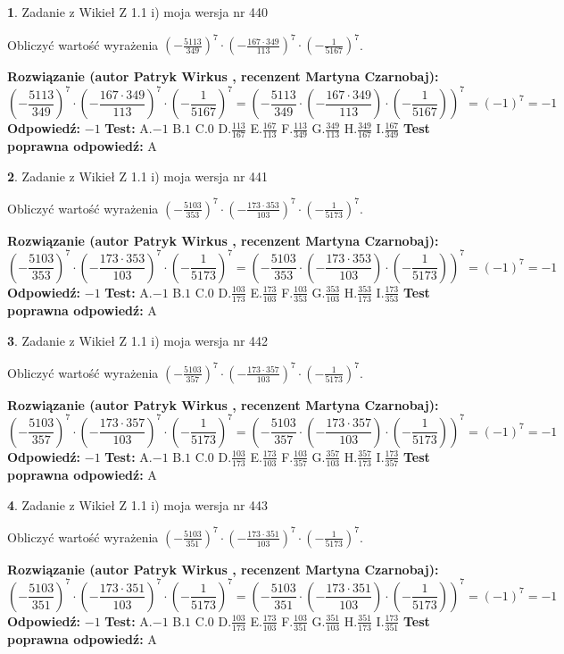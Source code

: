 \documentclass[12pt, a4paper]{article}
\theoremstyle{definition} %
\newtheorem{zad}{}
\newcommand{\zadStart}[1]{\begin{zad}#1\newline}
\newcommand{\zadStop}{\end{zad}}
\newcommand{\rozwStart}[2]{\noindent \textbf{Rozwiązanie (autor #1 , recenzent #2): }\newline}
\newcommand{\rozwStop}{\newline}
\newcommand{\odpStart}{\noindent \textbf{Odpowiedź:}\newline}
\newcommand{\odpStop}{\newline}
\newcommand{\testStart}{\noindent \textbf{Test:}\newline}
\newcommand{\testStop}{\newline}
\newcommand{\kluczStart}{\noindent \textbf{Test poprawna odpowiedź:}\newline}
\newcommand{\kluczStop}{\newline}
\begin{document}
\zadStart{Zadanie z Wikieł Z 1.1 i) moja wersja nr 440}

Obliczyć wartość wyrażenia $(-\frac{5113}{349})^{7} \cdot (-\frac{167 \cdot 349}{113})^{7} \cdot (-\frac{1}{5167})^{7}$.
\zadStop
\rozwStart{Patryk Wirkus}{Martyna Czarnobaj}
$$(-\frac{5113}{349})^{7} \cdot (-\frac{167 \cdot 349}{113})^{7} \cdot (-\frac{1}{5167})^{7} = (-\frac{5113}{349} \cdot (-\frac{167 \cdot 349}{113}) \cdot (-\frac{1}{5167}))^{7} = (-1)^{7} = -1$$
\rozwStop
\odpStart
$-1$
\odpStop
\testStart
A.$-1$ B.$1$ C.$0$ D.$\frac{113}{167}$ E.$\frac{167}{113}$
F.$\frac{113}{349}$ G.$\frac{349}{113}$
H.$\frac{349}{167}$
I.$\frac{167}{349}$
\testStop
\kluczStart
A
\kluczStop



\zadStart{Zadanie z Wikieł Z 1.1 i) moja wersja nr 441}

Obliczyć wartość wyrażenia $(-\frac{5103}{353})^{7} \cdot (-\frac{173 \cdot 353}{103})^{7} \cdot (-\frac{1}{5173})^{7}$.
\zadStop
\rozwStart{Patryk Wirkus}{Martyna Czarnobaj}
$$(-\frac{5103}{353})^{7} \cdot (-\frac{173 \cdot 353}{103})^{7} \cdot (-\frac{1}{5173})^{7} = (-\frac{5103}{353} \cdot (-\frac{173 \cdot 353}{103}) \cdot (-\frac{1}{5173}))^{7} = (-1)^{7} = -1$$
\rozwStop
\odpStart
$-1$
\odpStop
\testStart
A.$-1$ B.$1$ C.$0$ D.$\frac{103}{173}$ E.$\frac{173}{103}$
F.$\frac{103}{353}$ G.$\frac{353}{103}$
H.$\frac{353}{173}$
I.$\frac{173}{353}$
\testStop
\kluczStart
A
\kluczStop



\zadStart{Zadanie z Wikieł Z 1.1 i) moja wersja nr 442}

Obliczyć wartość wyrażenia $(-\frac{5103}{357})^{7} \cdot (-\frac{173 \cdot 357}{103})^{7} \cdot (-\frac{1}{5173})^{7}$.
\zadStop
\rozwStart{Patryk Wirkus}{Martyna Czarnobaj}
$$(-\frac{5103}{357})^{7} \cdot (-\frac{173 \cdot 357}{103})^{7} \cdot (-\frac{1}{5173})^{7} = (-\frac{5103}{357} \cdot (-\frac{173 \cdot 357}{103}) \cdot (-\frac{1}{5173}))^{7} = (-1)^{7} = -1$$
\rozwStop
\odpStart
$-1$
\odpStop
\testStart
A.$-1$ B.$1$ C.$0$ D.$\frac{103}{173}$ E.$\frac{173}{103}$
F.$\frac{103}{357}$ G.$\frac{357}{103}$
H.$\frac{357}{173}$
I.$\frac{173}{357}$
\testStop
\kluczStart
A
\kluczStop



\zadStart{Zadanie z Wikieł Z 1.1 i) moja wersja nr 443}

Obliczyć wartość wyrażenia $(-\frac{5103}{351})^{7} \cdot (-\frac{173 \cdot 351}{103})^{7} \cdot (-\frac{1}{5173})^{7}$.
\zadStop
\rozwStart{Patryk Wirkus}{Martyna Czarnobaj}
$$(-\frac{5103}{351})^{7} \cdot (-\frac{173 \cdot 351}{103})^{7} \cdot (-\frac{1}{5173})^{7} = (-\frac{5103}{351} \cdot (-\frac{173 \cdot 351}{103}) \cdot (-\frac{1}{5173}))^{7} = (-1)^{7} = -1$$
\rozwStop
\odpStart
$-1$
\odpStop
\testStart
A.$-1$ B.$1$ C.$0$ D.$\frac{103}{173}$ E.$\frac{173}{103}$
F.$\frac{103}{351}$ G.$\frac{351}{103}$
H.$\frac{351}{173}$
I.$\frac{173}{351}$
\testStop
\kluczStart
A
\kluczStop
\end{document}
